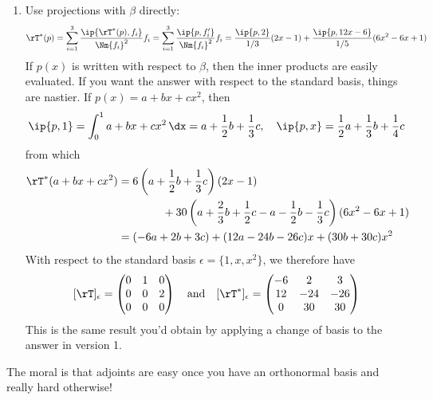 \begin{example}{}{}
\begin{enumerate}
  \item Use projections with $\beta$ directly:
  \[\rT^*(p)=\sum_{i=1}^3\frac{\ip{\rT^*(p),f_i}}{\Nm{f_i}^2}f_i =\sum_{i=1}^3\frac{\ip{p,f'_i}}{\Nm{f_i}^2}f_i =\frac{\ip{p,2}}{1/3}(2x-1) +\frac{\ip{p,12x-6}}{1/5}(6x^2-6x+1)\]
  If $p(x)$ is written with respect to $\beta$, then the inner products are easily evaluated. If you want the answer with respect to the standard basis, things are nastier. If $p(x)=a+bx+cx^2$, then
  \[\ip{p,1}=\int_0^1a+bx+cx^2\,\dx=a+\frac 12b+\frac 13c,\quad \ip{p,x}=\frac 12a+\frac 13b+\frac 14c\]
 	from which
  \begin{align*}
  \rT^*(a+bx+cx^2)&=6\left(a+\frac 12b+\frac 13c\right)(2x-1)\\
  &\qquad\qquad +30\left(a+\frac 23b+\frac 12c-a-\frac 12b-\frac 13c\right)(6x^2-6x+1)\\
  &=(-6a+2b+3c) +(12a-24b-26c)x+(30b+30c)x^2
  \end{align*}
  With respect to the standard basis $\epsilon=\{1,x,x^2\}$, we therefore have
  \[[\rT]_\epsilon=\begin{pmatrix}
  0&1&0\\
  0&0&2\\
  0&0&0
  \end{pmatrix}\quad\text{and}\quad
  [\rT^*]_\epsilon=\begin{pmatrix}
  -6&2&3\\
  12&-24&-26\\
  0&30&30
  \end{pmatrix}\]
  This is the same result you'd obtain by applying a change of basis to the answer in version 1.
\end{enumerate}
% 
% 
\end{example}
The moral is that adjoints are easy once you have an orthonormal basis and really hard otherwise! 

